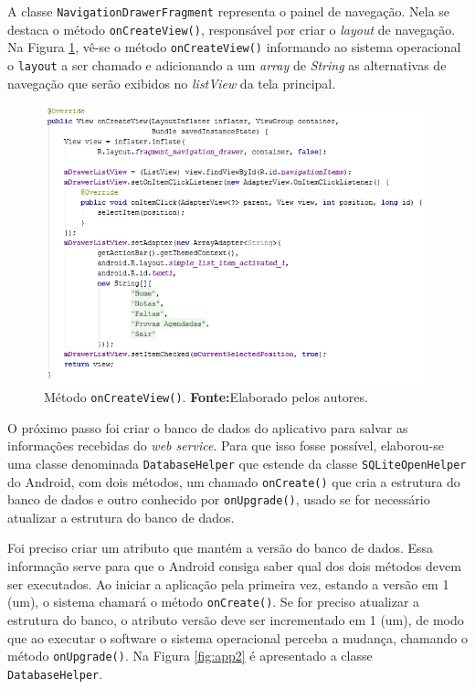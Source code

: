 	\pagebreak

	\par A classe \texttt{NavigationDrawerFragment} representa o painel de
navegação. Nela se destaca o método \texttt{onCreateView()}, responsável por
criar o \textit{layout} de navegação. Na Figura \ref{fig:app1}, vê-se o método
\texttt{onCreateView()} informando ao sistema operacional o \texttt{layout} a
ser chamado e adicionando a um \textit{array} de \textit{String} as
alternativas de navegação que serão exibidos no \textit{listView} da tela
principal.

	\begin{figure}[h!] 
		\centerline{\includegraphics[scale=0.7]{./imagens/2_q_metodologico/4_procedimentos_resultados/42_aplicativo/app1.png}}
		\caption[Método onCreateView()]{Método \texttt{onCreateView()}.
		\textbf{Fonte:}Elaborado pelos autores.}
		\label{fig:app1}
	\end{figure}
	
	\par O próximo passo foi criar o banco de dados do aplicativo para salvar as
informações recebidas do \textit{web service}. Para que isso fosse possível,
elaborou-se uma classe denominada \texttt{DatabaseHelper} que estende da classe
\texttt{SQLiteOpenHelper} do Android, com dois métodos, um chamado
\texttt{onCreate()} que cria a estrutura do banco de dados e outro conhecido
por \texttt{onUpgrade()}, usado se for necessário atualizar a estrutura do
banco de dados.

	\par Foi preciso criar um atributo que mantém a versão do banco de dados. Essa
informação serve para que o Android consiga saber qual dos dois métodos devem
ser executados. Ao iniciar a aplicação pela primeira vez, estando a versão em 1
(um), o sistema chamará o método \texttt{onCreate()}. Se for preciso atualizar
a estrutura do banco, o atributo versão deve ser incrementado em 1 (um), de
modo que ao executar o software o sistema operacional perceba a mudança,
chamando o método \texttt{onUpgrade()}. Na Figura \ref{fig:app2} é apresentado a
classe \texttt{DatabaseHelper}.

